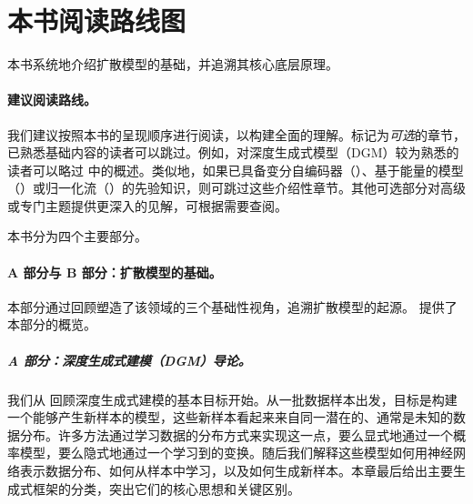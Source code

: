 
\section*{\centering \Large 本书阅读路线图}

本书系统地介绍扩散模型的基础，并追溯其核心底层原理。

\paragraph{建议阅读路线。}  
我们建议按照本书的呈现顺序进行阅读，以构建全面的理解。标记为\emph{可选}的章节，已熟悉基础内容的读者可以跳过。例如，对深度生成式模型（DGM）较为熟悉的读者可以略过 中的概述。类似地，如果已具备变分自编码器（）、基于能量的模型（）或归一化流（）的先验知识，则可跳过这些介绍性章节。其他可选部分对高级或专门主题提供更深入的见解，可根据需要查阅。

本书分为四个主要部分。
\paragraph{A 部分与 B 部分：扩散模型的基础。}
本部分通过回顾塑造了该领域的三个基础性视角，追溯扩散模型的起源。 提供了本部分的概览。

\subparagraph{A 部分：深度生成式建模（DGM）导论。}
我们从 回顾深度生成式建模的基本目标开始。从一批数据样本出发，目标是构建一个能够产生新样本的模型，这些新样本看起来来自同一潜在的、通常是未知的数据分布。许多方法通过学习数据的分布方式来实现这一点，要么显式地通过一个概率模型，要么隐式地通过一个学习到的变换。随后我们解释这些模型如何用神经网络表示数据分布、如何从样本中学习，以及如何生成新样本。本章最后给出主要生成式框架的分类，突出它们的核心思想和关键区别。









